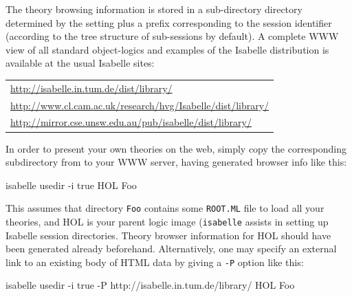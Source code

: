 \begin{isabellebody}
\begin{isamarkuptext}
  \bigskip The theory browsing information is stored in a
  sub-directory directory determined by the \hyperlink{setting.ISABELLE-BROWSER-INFO}{\mbox{}} setting plus a prefix corresponding to the
  session identifier (according to the tree structure of sub-sessions
  by default).  A complete WWW view of all standard object-logics and
  examples of the Isabelle distribution is available at the usual
  Isabelle sites:
  \begin{center}\small
  \begin{tabular}{l}
    \url{http://isabelle.in.tum.de/dist/library/} \\
    \url{http://www.cl.cam.ac.uk/research/hvg/Isabelle/dist/library/} \\
    \url{http://mirror.cse.unsw.edu.au/pub/isabelle/dist/library/} \\
  \end{tabular}
  \end{center}
  
  \medskip In order to present your own theories on the web, simply
  copy the corresponding subdirectory from \hyperlink{setting.ISABELLE-BROWSER-INFO}{\mbox{}} to your WWW server, having generated browser
  info like this:
\begin{ttbox}
isabelle usedir -i true HOL Foo
\end{ttbox}

  This assumes that directory \verb|Foo| contains some \verb|ROOT.ML| file to load all your theories, and HOL is your parent
  logic image (\verb|isabelle| \hyperlink{tool.mkdir}{\mbox{}} assists in
  setting up Isabelle session directories.  Theory browser information
  for HOL should have been generated already beforehand.
  Alternatively, one may specify an external link to an existing body
  of HTML data by giving \hyperlink{tool.usedir}{\mbox{}} a \verb|-P| option like
  this:
\begin{ttbox}
isabelle usedir -i true -P http://isabelle.in.tum.de/library/ HOL Foo
\end{ttbox}


\end{isamarkuptext}
\end{isabellebody}
